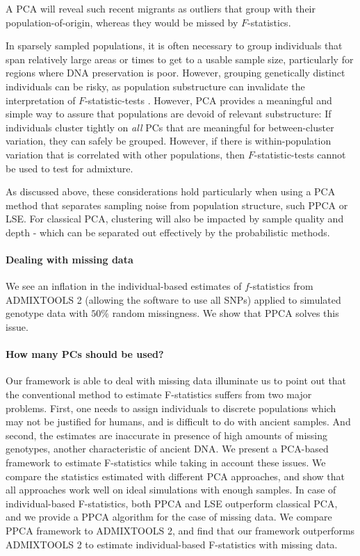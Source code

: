 \documentclass[12pt, letterpaper]{article}
\begin{document}
A PCA will reveal such recent migrants as outliers that group with their population-of-origin, whereas they would be missed by $F$-statistics.

In sparsely sampled populations, it is often necessary to group individuals that span relatively large areas or times to get to a usable sample size, particularly for regions where DNA preservation is poor. However, grouping genetically distinct individuals can be risky, as population substructure can invalidate the interpretation of $F$-statistic-tests \cite{peter_admixture_2016}. However, PCA provides a meaningful and simple way to assure that populations are devoid of relevant substructure: If individuals  cluster tightly on \emph{all} PCs that are meaningful for between-cluster variation, they can safely be grouped. However, if there is within-population variation that is correlated with other populations, then $F$-statistic-tests cannot be used to test for admixture. 

As discussed above, these considerations hold particularly when using a PCA method that separates sampling noise from population structure, such PPCA or LSE. For classical PCA, clustering will also be impacted by sample quality and depth - which can be separated out effectively by the probabilistic methods.


\paragraph{Dealing with missing data}
We see an inflation in the individual-based estimates of $f$-statistics from ADMIXTOOLS 2 (allowing the software to use all SNPs) applied to simulated genotype data with $50\%$ random missingness. We show that PPCA solves this issue.

\paragraph{How many PCs should be used?}
Our framework is able to deal with missing data illuminate us to point out that the conventional method to estimate F-statistics suffers from two major problems. First, one needs to assign individuals to discrete populations which may not be justified for humans, and is difficult to do with ancient samples. And second, the estimates are inaccurate in presence of high amounts of missing genotypes, another characteristic of ancient DNA. We present a PCA-based framework to estimate F-statistics while taking in account these issues. We compare the statistics estimated with different PCA approaches, and show that all approaches work well on ideal simulations with enough samples. In case of individual-based F-statistics, both PPCA and LSE outperform classical PCA, and we provide a PPCA algorithm for the case of missing data. We compare PPCA framework to ADMIXTOOLS 2, and find that our framework outperforms ADMIXTOOLS 2 to estimate individual-based F-statistics with missing data.  
\end{document}

